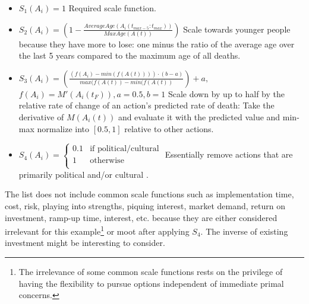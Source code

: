 \documentclass[10pt, a4paper, twocolumn]{IEEEconf}
\begin{document}
\begin{itemize}
  \item $S_1(A_i) = 1$
                  \newline\newline
                  Required scale function.
  \item $S_2(A_i) = \left(1 - \frac{AverageAge(A_i(t_{max-5}:t_{max}))}{MaxAge(A(t))}\right)$
                  \newline\newline
                  Scale towards younger people because they have more to lose: one minus the ratio of the average age \citep{nbermortality} over the last 5 years compared to the maximum age of all deaths.
  \item $S_3(A_i) = \left(\frac{(f(A_i)-min(f(A(t)))) \cdot (b-a)}{max(f(A(t))-min(f(A(t))}\right) + a,$
                  \newline\newline
                  $f(A_i) = M'(A_i(t_F)), a=0.5, b=1$
                  \newline\newline
                  Scale down by up to half by the relative rate of change of an action's predicted rate of death: Take the derivative of $M(A_i(t))$ and evaluate it with the predicted value and min-max normalize into $[0.5,1]$ relative to other actions.
  \item $S_4(A_i) = \begin{cases}\text{0.1} & \mbox{if political/cultural} \\ \text{1} & \mbox{otherwise} \\ \end{cases}$
                  \newline\newline
                  Essentially remove actions that are primarily political and/or cultural \citep{huemer2012praise}.
\end{itemize}

The list does not include common scale functions such as implementation time, cost, risk, playing into strengths, piquing interest, market demand, return on investment, ramp-up time, interest, etc. because they are either considered irrelevant for this example\footnote{The irrelevance of some common scale functions rests on the privilege of having the flexibility to pursue options independent of immediate primal concerns.} or moot after applying $S_4$.
The inverse of existing investment might be interesting to consider.
\end{document}
